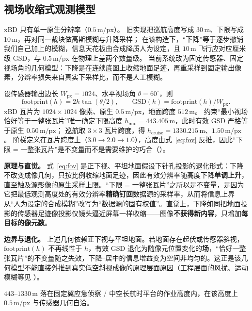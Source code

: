 \subsection{视场收缩式观测模型}
\label{sec:gsd}
xBD 只有单一原生分辨率（$0.5\,\mathrm{m/px}$）。
旧实现把巡航高度写成 $30\,\mathrm{m}$、下限写成 $10\,\mathrm{m}$，再对同一裁块做高斯模糊与升降采样；
在该构造下，``下降''等于逐步撤销我们自己加上的模糊，信息天花板由合成降质人为设定，且 $10\,\mathrm{m}$ 飞行应对应厘米级 GSD，与 $0.5\,\mathrm{m/px}$ 在物理上差两个数量级。
当前系统改为固定传感器、固定视场角的几何模型：下降是在连续底图上收缩地面足迹，再重采样到固定输出像素，分辨率损失来自真实下采样比，而不是人工模糊。

设传感器输出边长 $W_{\mathrm{px}}=1024$、水平视场角 $\theta=60^\circ$，则
\begin{equation}
\label{eq:fov}
\mathrm{footprint}(h)=2h\tan(\theta/2),\qquad
\mathrm{GSD}(h)=\mathrm{footprint}(h)/W_{\mathrm{px}}.
\end{equation}
xBD 瓦片为 $1024\times1024$ 像素、原生 $0.5\,\mathrm{m/px}$，地面跨度 $512\,\mathrm{m}$。
约束``最小视场恰好等于一整张瓦片''唯一确定下限高度 $h_{\min}=443.405\,\mathrm{m}$，此时有效 GSD 严格等于原生 $0.50\,\mathrm{m/px}$；
巡航取 $3\times3$ 瓦片跨度，得 $h_{\mathrm{cruise}}=1330.215\,\mathrm{m}$、$1.50\,\mathrm{m/px}$。
阶梯定义在瓦片跨度上（$3.0\to2.0\to1.0$），高度由式~\eqref{eq:fov} 反推，因此``下限 = 一整张瓦片''是不变量而不是需要维护的巧合（）。

\textbf{原理与直觉。} 式~\eqref{eq:fov} 是正下视、平坦地面假设下针孔投影的退化形式：下降不改变成像几何，只按比例收缩地面足迹，因此有效分辨率随高度下降\textbf{单调上升}，直至触及源影像的原生采样上限。``下限 = 一整张瓦片''之所以是不变量，是因为它把最低观测高度处的有效分辨率\textbf{精确钉回}数据源的采样率，从而将信息上界从``人为设定的合成模糊''改写为``数据源的固有权值''。直觉上，下降如同把地面投影的传感器足迹像投影仪镜头逼近屏幕一样收缩——图像\textbf{不获得新内容}，只增加\textbf{每目标的像元数}。

\textbf{边界与退化。} 上述几何依赖正下视与平坦地面。若地面存在起伏或传感器斜视，$\mathrm{footprint}(h)$ 不再线性于 $h$，有效 GSD 退化为随像元位置变化的\textbf{场}，``恰好一整张瓦片''的不变量随之失效，下降--居中的信息增益变为空间非均匀的。这正是该几何模型不能直接外推到真实低空斜视成像的原理层面原因（工程层面的风扰、运动模糊等见 ）。

$443$--$1330\,\mathrm{m}$ 落在固定翼应急侦察 / 中空长航时平台的作业高度内，在该高度上 $0.5\,\mathrm{m/px}$ 与传感器几何自洽。

